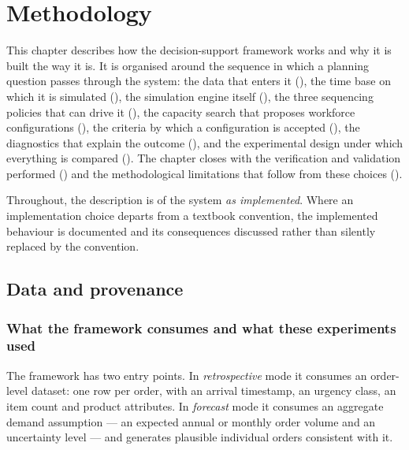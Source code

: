 \chapter{Methodology}
\label{ch:methodology}

This chapter describes how the decision-support framework works and why it is built the way it
is. It is organised around the sequence in which a planning question passes through the system:
the data that enters it (), the time base on
which it is simulated (), the simulation engine itself
(), the three sequencing policies that can drive it
(), the capacity search that proposes workforce configurations
(), the criteria by which a configuration is
accepted (), the diagnostics that explain the outcome
(), and the experimental design under which everything is
compared (). The chapter closes with the verification and
validation performed () and the methodological limitations that follow
from these choices ().

Throughout, the description is of the system \emph{as implemented}. Where an implementation
choice departs from a textbook convention, the implemented behaviour is documented and its
consequences discussed rather than silently replaced by the convention.

\section{Data and provenance}
\label{sec:data-provenance}

\subsection{What the framework consumes and what these experiments used}

The framework has two entry points. In \emph{retrospective} mode it consumes an order-level
dataset: one row per order, with an arrival timestamp, an urgency class, an item count and
product attributes. In \emph{forecast} mode it consumes an aggregate demand assumption --- an
expected annual or monthly order volume and an uncertainty level --- and generates plausible
individual orders consistent with it.

